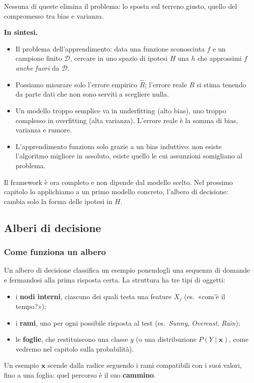 \documentclass[12pt]{extarticle}
\begin{document}
\noindent Nessuna di queste elimina il problema: lo sposta sul terreno giusto, quello del compromesso tra bias e varianza.

\noindent\textbf{In sintesi.}
\begin{itemize}
    \item Il problema dell'apprendimento: data una funzione sconosciuta $f$ e un campione finito $\mathcal{D}$, cercare in uno spazio di ipotesi $H$ una $h$ che approssimi $f$ \emph{anche fuori} da $\mathcal{D}$.
    \item Possiamo misurare solo l'errore empirico $\hat{R}$; l'errore reale $R$ si stima tenendo da parte dati che non sono serviti a scegliere nulla.
    \item Un modello troppo semplice va in underfitting (alto bias), uno troppo complesso in overfitting (alta varianza). L'errore reale è la somma di bias, varianza e rumore.
    \item L'apprendimento funziona solo grazie a un bias induttivo: non esiste l'algoritmo migliore in assoluto, esiste quello le cui assunzioni somigliano al problema.
\end{itemize}

\noindent Il framework è ora completo e non dipende dal modello scelto. Nel prossimo capitolo lo applichiamo a un primo modello concreto, l'albero di decisione: cambia solo la forma delle ipotesi in $H$.

\subsection{Alberi di decisione}

\subsubsection{Come funziona un albero}

\noindent Un albero di decisione classifica un esempio ponendogli una sequenza di domande e fermandosi alla prima risposta certa. La struttura ha tre tipi di oggetti:
\begin{itemize}
    \item i \textbf{nodi interni}, ciascuno dei quali testa una feature $X_j$ (es.\ «com'è il tempo?»);
    \item i \textbf{rami}, uno per ogni possibile risposta al test (es.\ \textit{Sunny}, \textit{Overcast}, \textit{Rain});
    \item le \textbf{foglie}, che restituiscono una classe $y$ (o una distribuzione $P(Y \mid \mathbf{x})$, come vedremo nel capitolo sulla probabilità).
\end{itemize}
Un esempio $\mathbf{x}$ scende dalla radice seguendo i rami compatibili con i suoi valori, fino a una foglia: quel percorso è il suo \textbf{cammino}.
\end{document}

